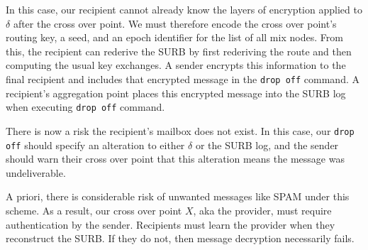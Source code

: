 In this case, our recipient cannot already know the layers of
encryption applied to $\delta$ after the cross over point.  
We must therefore encode the cross over point's routing key, a seed,
and an epoch identifier for the list of all mix nodes.  From this,
the recipient can rederive the SURB by first rederiving the route
and then computing the usual key exchanges.  A sender encrypts this
information to the final recipient and includes that encrypted
message in the {\tt drop off} command.  A recipient's aggregation
point places this encrypted message into the SURB log when executing
{\tt drop off} command.

There is now a risk the recipient's mailbox does not exist. 
In this case, our {\tt drop off} should specify an alteration to
either $\delta$ or the SURB log, and the sender should warn their
cross over point that this alteration means the message was undeliverable.

A priori, there is considerable risk of unwanted messages like SPAM
under this scheme.  As a result, our cross over point $X$, aka the
provider, must require authentication by the sender.  
Recipients must learn the provider when they reconstruct the SURB.  
If they do not, then message decryption necessarily fails.



